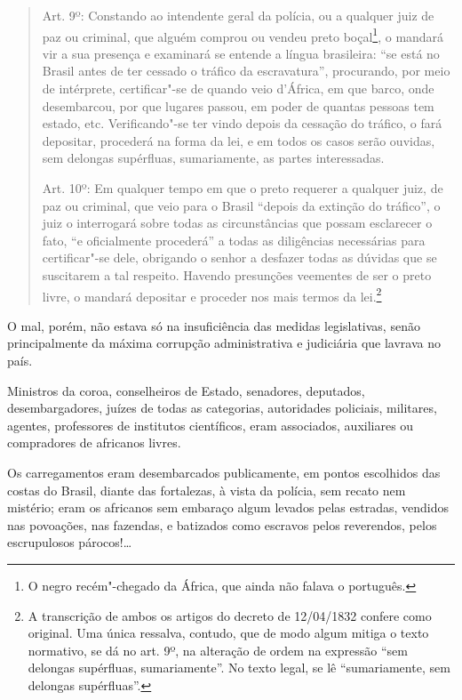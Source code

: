 \begin{quote}
Art. 9º: Constando ao intendente geral da polícia, ou a qualquer juiz
de paz ou criminal, que alguém comprou ou vendeu preto boçal\footnote{
  O negro recém"-chegado da África, que ainda não falava o português.}, o
mandará vir a sua presença e examinará se entende a língua brasileira:
``se está no Brasil antes de ter cessado o tráfico da escravatura'',
procurando, por meio de intérprete, certificar"-se de quando veio
d'África, em que barco, onde desembarcou, por que lugares passou, em
poder de quantas pessoas tem estado, etc. Verificando"-se ter vindo
depois da cessação do tráfico, o fará depositar, procederá na forma da
lei, e em todos os casos serão ouvidas, sem delongas supérfluas,
sumariamente, as partes interessadas.

Art. 10º: Em qualquer tempo em que o preto requerer a qualquer juiz, de
paz ou criminal, que veio para o Brasil ``depois da extinção do tráfico'',
o juiz o interrogará sobre todas as circunstâncias que possam esclarecer
o fato, ``e oficialmente procederá'' a todas as diligências necessárias
para certificar"-se dele, obrigando o senhor a desfazer todas as dúvidas
que se suscitarem a tal respeito. Havendo presunções veementes de ser o
preto livre, o mandará depositar e proceder nos mais termos da
lei.\footnote{A transcrição de ambos os artigos do decreto de
  12/04/1832 confere como original. Uma única ressalva, contudo, que de
  modo algum mitiga o texto normativo, se dá no art. 9º, na alteração
  de ordem na expressão ``sem delongas supérfluas, sumariamente''. No
  texto legal, se lê ``sumariamente, sem delongas
  supérfluas''.}
\end{quote}  

O mal, porém, não estava só na insuficiência das medidas legislativas,
senão principalmente da máxima corrupção administrativa e judiciária que
lavrava no país.

Ministros da coroa, conselheiros de Estado, senadores, deputados,
desembargadores, juízes de todas as categorias, autoridades policiais,
militares, agentes, professores de institutos científicos, eram
associados, auxiliares ou compradores de africanos livres.

Os carregamentos eram desembarcados publicamente, em pontos escolhidos
das costas do Brasil, diante das fortalezas, à vista da polícia, sem
recato nem mistério; eram os africanos sem embaraço algum levados pelas
estradas, vendidos nas povoações, nas fazendas, e batizados como
escravos pelos reverendos, pelos escrupulosos párocos!\ldots{}

